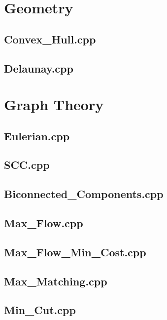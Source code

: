 \section{Geometry}
\subsection{Convex\_Hull.cpp}

\subsection{Delaunay.cpp}

\section{Graph Theory}
\subsection{Eulerian.cpp}

\subsection{SCC.cpp}

\subsection{Biconnected\_Components.cpp}

\subsection{Max\_Flow.cpp}

\subsection{Max\_Flow\_Min\_Cost.cpp}

\subsection{Max\_Matching.cpp}

\subsection{Min\_Cut.cpp}

